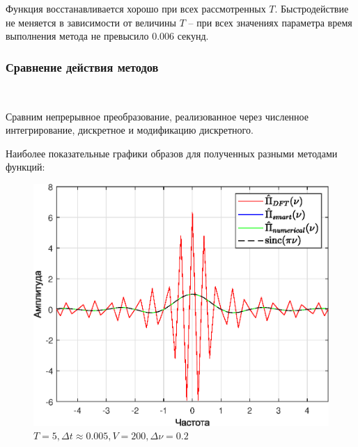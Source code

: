 \documentclass[a4paper]{article}
\begin{document}
Функция восстанавливается хорошо при всех рассмотренных $T$. Быстродействие не меняется в зависимости от величины $T$ -- при всех значениях параметра время выполнения метода не превысило 0.006 секунд.

\subsubsection{Сравнение действия методов}\

Сравним непрерывное преобразование, реализованное через численное интегрирование, дискретное и модификацию дискретного.

Наиболее показательные графики образов для полученных разными методами функций:

\begin{figure}[H]
    \begin{minipage}{0.5\textwidth}
        \centering \includegraphics[width=\textwidth]{graphs/3/T_5_dt_0.005005_V_200_dv_0.2/fourier_combined_all.eps}
        \caption{$T = 5, \Delta t \approx 0.005, V = 200, \Delta \nu = 0.2$} %
    \end{minipage}\hfill
    \begin{minipage}{0.5\textwidth}

\end{minipage}
\end{figure}
\end{document}
